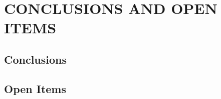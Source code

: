 %
%
%
\chapter{\uppercase {Conclusions and Open Items}}



\section{Conclusions}
\label{sec::Conclusions_Conclusions}





\section{Open Items}
\label{sec::Conclusions_Open_Items}